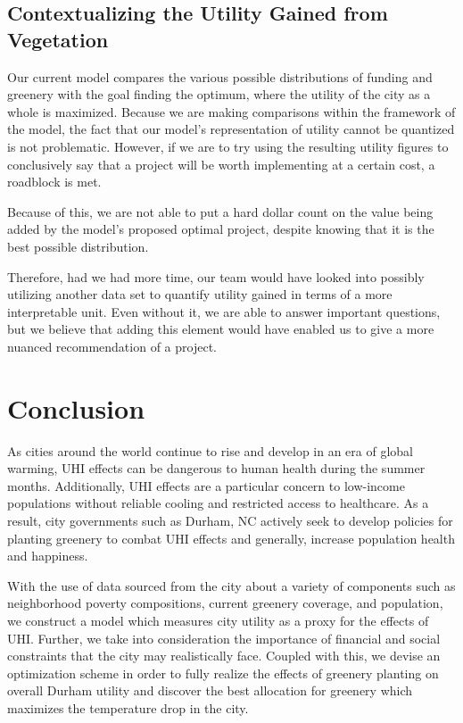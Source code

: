 \documentclass[11pt]{article}
\begin{document}
\subsection{Contextualizing the Utility Gained from Vegetation}
Our current model compares the various possible distributions of funding and greenery with the goal finding the optimum, where the utility of the city as a whole is maximized. Because we are making comparisons within the framework of the model, the fact that our model's representation of utility cannot be quantized is not problematic. However, if we are to try using the resulting utility figures to conclusively say that a project will be worth implementing at a certain cost, a roadblock is met.

Because of this, we are not able to put a hard dollar count on the value being added by the model's proposed optimal project, despite knowing that it is the best possible distribution.

Therefore, had we had more time, our team would have looked into possibly utilizing another data set to quantify utility gained in terms of a more interpretable unit. Even without it, we are able to answer important questions, but we believe that adding this element would have enabled us to give a more nuanced recommendation of a project.
\pagebreak

\section{Conclusion}
As cities around the world continue to rise and develop in an era of global warming, UHI effects can be dangerous to human health during the summer months. Additionally, UHI effects are a particular concern to low-income populations without reliable cooling and restricted access to healthcare. As a result, city governments such as Durham, NC actively seek to develop policies for planting greenery to combat UHI effects and generally, increase population health and happiness.

With the use of data sourced from the city about a variety of components such as neighborhood poverty compositions, current greenery coverage, and population, we construct a model which measures city utility as a proxy for the effects of UHI. Further, we take into consideration the importance of financial and social constraints that the city may realistically face. Coupled with this, we devise an optimization scheme in order to fully realize the effects of greenery planting on overall Durham utility and discover the best allocation for greenery which maximizes the temperature drop in the city.
\end{document}
